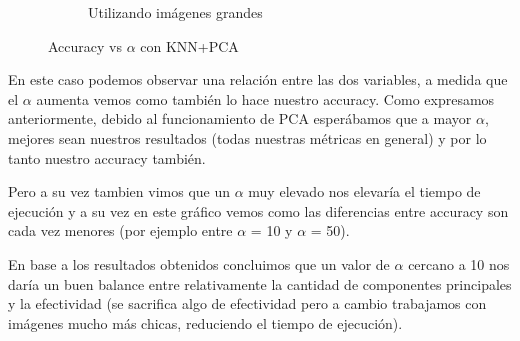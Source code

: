 \begin{figure}[H]
\begin{subfigure}[h]{0.62\linewidth}
\caption{Utilizando imágenes grandes}
\end{subfigure}%
\caption{Accuracy vs $\alpha$ con KNN+PCA}
\end{figure}

En este caso podemos observar una relación entre las dos variables, a medida que el $\alpha$ aumenta vemos como también lo hace nuestro accuracy.
Como expresamos anteriormente, debido al funcionamiento de PCA esperábamos que a mayor $\alpha$, mejores sean nuestros resultados (todas nuestras métricas en general) y por lo tanto nuestro accuracy también.

Pero a su vez tambien vimos que un $\alpha$ muy elevado  nos elevaría el tiempo de ejecución y a su vez en este gráfico vemos como las diferencias entre accuracy son cada vez menores (por ejemplo entre $\alpha$ = 10 y $\alpha$ = 50).

En base a los resultados obtenidos concluimos que un valor de $\alpha$ cercano a 10 nos daría un buen balance entre relativamente la cantidad de componentes principales y la efectividad (se sacrifica algo de efectividad pero a cambio trabajamos con imágenes mucho más chicas, reduciendo el tiempo de ejecución).

